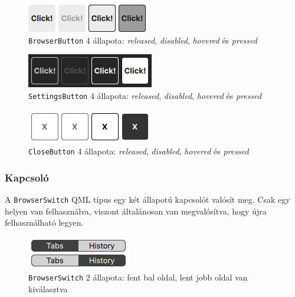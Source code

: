 \documentclass[12pt]{report}
\begin{document}
\begin{figure}[H]
    \centering
    \includegraphics[scale=0.8]{BrowserButton}
    \caption{
        \label{fig:browser-button}
        \texttt{BrowserButton} 4 állapota: \textit{released}, \textit{disabled},
        \textit{hovered} és \textit{pressed}
    }
\end{figure}
\begin{figure}[H]
    \centering
    \includegraphics[scale=0.8]{SettingsButton}
    \caption{
        \label{fig:settings-button}
        \texttt{SettingsButton} 4 állapota: \textit{released}, \textit{disabled},
        \textit{hovered} és \textit{pressed}
    }
\end{figure}
\begin{figure}[H]
    \centering
    \includegraphics[scale=0.8]{CloseButton}
    \caption{
        \label{fig:close-button}
        \texttt{CloseButton} 4 állapota: \textit{released}, \textit{disabled},
        \textit{hovered} és \textit{pressed}
    }
\end{figure}


\subsubsection{Kapcsoló}
A \texttt{BrowserSwitch} QML típus egy két állapotú kapcsolót valósít meg. Csak egy helyen
van felhasználva, viszont általánosan van megvalósítva, hogy újra felhasználható legyen.

\begin{figure}[H]
    \centering
    \includegraphics[scale=0.8]{BrowserSwitch-wide}
    \caption{
        \label{fig:browser-switch}
        \texttt{BrowserSwitch} 2 állapota: fent bal oldal, lent jobb oldal van kiválasztva
    }
\end{figure}
\end{document}

